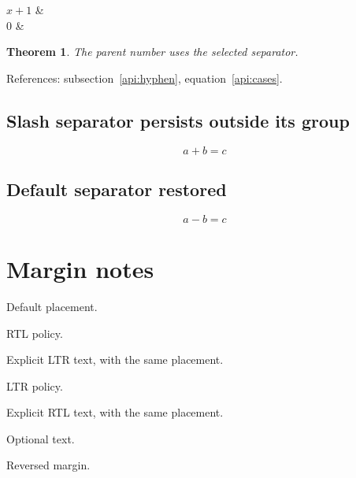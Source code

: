 \documentclass{article}
\newtheorem{apitest}{Theorem}[subsection]
\begin{document}
\begin{RTL}
    \begin{RTLcases}
        $x+1$ & \\
        $0$   & 
    \end{RTLcases}
\end{RTL}

\begin{apitest}
    The parent number uses the selected separator.
\end{apitest}

References: subsection~\ref{api:hyphen}, equation~\eqref{api:cases}.

{\SepMark{/}}
\subsection{Slash separator persists outside its group}
\begin{equation}a+b=c\end{equation}

\subsection{Default separator restored}
\begin{equation}a-b=c\end{equation}

\clearpage
\section{Margin notes}

Default placement.
\par\bigskip

\setRTLmarginpar
RTL policy.
\par\bigskip
Explicit LTR text, with the same placement.
\par\bigskip

\setLTRmarginpar
LTR policy.
\par\bigskip
Explicit RTL text, with the same placement.
\par\bigskip

\setdefaultmarginpar
Optional text.
\par\bigskip

\reversemarginpar
Reversed margin.
\par\bigskip
\normalmarginpar
\end{document}

